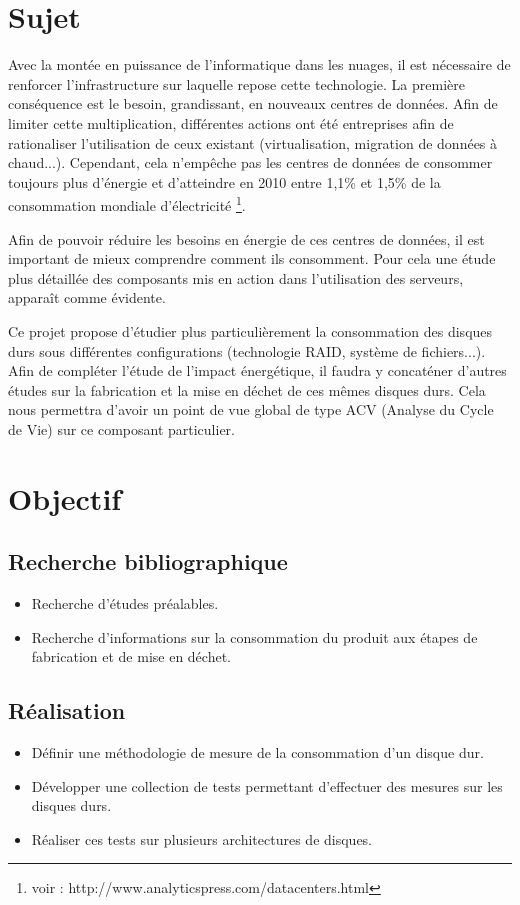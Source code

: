 \documentclass[a4paper, 11pt]{report}
\begin{document}
	\section{Sujet}
Avec la montée en puissance de l’informatique dans les nuages, il est nécessaire de renforcer l’infrastructure sur laquelle repose cette technologie. La première conséquence est le besoin, grandissant, en nouveaux centres de données. Afin de limiter cette multiplication, différentes actions ont été entreprises afin de rationaliser l’utilisation de ceux existant (virtualisation, migration de données à chaud...). Cependant, cela n'empêche pas les centres de données de consommer toujours plus d’énergie et d’atteindre en 2010 entre 1,1\% et 1,5\% de la consommation mondiale d’électricité \footnote{voir : http://www.analyticspress.com/datacenters.html}.

Afin de pouvoir réduire les besoins en énergie de ces centres de données, il est important de mieux comprendre comment ils consomment. Pour cela une étude plus détaillée des composants mis en action dans l’utilisation des serveurs, apparaît comme évidente.

Ce projet propose d’étudier plus particulièrement la consommation des disques durs sous différentes configurations (technologie RAID, système de fichiers...). Afin de compléter l’étude de l’impact énergétique, il faudra y concaténer d’autres études sur la fabrication et la mise en déchet de ces mêmes disques durs. Cela nous permettra d’avoir un point de vue global de type ACV (Analyse du Cycle de Vie) sur ce composant particulier.
	
	\section{Objectif}
		\subsection{Recherche bibliographique}
\begin{itemize}
	\item Recherche d’études préalables.
	\item Recherche d’informations sur la consommation du produit aux étapes de fabrication et de mise en déchet.
\end{itemize}

		\subsection{Réalisation}
\begin{itemize}
	\item Définir une méthodologie de mesure de la consommation d’un disque dur.
	\item Développer une collection de tests permettant d’effectuer des mesures sur les disques durs.
	\item Réaliser ces tests sur plusieurs architectures de disques.
\end{itemize}
\end{document}
